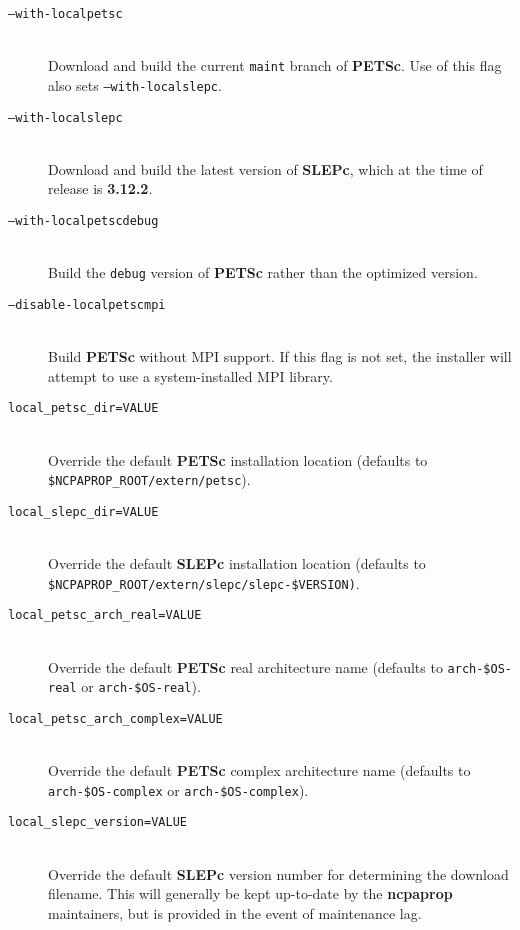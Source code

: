 \begin{description}
\item[\texttt{--with-localpetsc}]\hfill \\
\noindent
Download and build the current \texttt{maint} branch of \textbf{PETSc}.  Use of this flag also sets \texttt{--with-localslepc}.

\item[\texttt{--with-localslepc}]\hfill \\
\noindent
Download and build the latest version of \textbf{SLEPc}, which at the time of release is \textbf{3.12.2}.

\item[\texttt{--with-localpetscdebug}]\hfill \\
\noindent
Build the \texttt{debug} version of \textbf{PETSc} rather than the optimized version.

\item[\texttt{--disable-localpetscmpi}]\hfill \\
\noindent
Build \textbf{PETSc} without MPI support.  If this flag is not set, the installer will attempt to use a system-installed MPI library.

\item[\texttt{local\_petsc\_dir=VALUE}]\hfill \\
\noindent
Override the default \textbf{PETSc} installation location (defaults to \texttt{\$NCPAPROP\_ROOT/extern/petsc}).

\item[\texttt{local\_slepc\_dir=VALUE}]\hfill \\
\noindent
Override the default \textbf{SLEPc} installation location (defaults to \texttt{\$NCPAPROP\_ROOT/extern/slepc/slepc-\$VERSION)}.

\item[\texttt{local\_petsc\_arch\_real=VALUE}]\hfill \\
\noindent
Override the default \textbf{PETSc} real architecture name (defaults to \texttt{arch-\$OS-real} or \texttt{arch-\$OS-real}).

\item[\texttt{local\_petsc\_arch\_complex=VALUE}]\hfill \\
\noindent
Override the default \textbf{PETSc} complex architecture name (defaults to \texttt{arch-\$OS-complex} or \texttt{arch-\$OS-complex}).

\item[\texttt{local\_slepc\_version=VALUE}]\hfill \\
\noindent
Override the default \textbf{SLEPc} version number for determining the download filename.  This will generally be kept up-to-date by the \textbf{ncpaprop} maintainers, but is provided in the event of maintenance lag.
\end{description}

